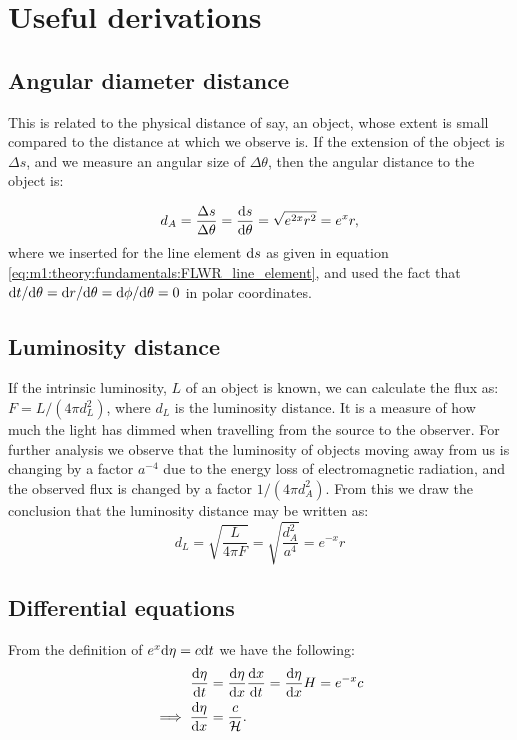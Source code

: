 \appendix

\section{Useful derivations}\label{app:derivations}
    \subsection{Angular diameter distance}
        This is related to the physical distance of say, an object, whose extent is small compared to the distance at which we observe is. If the extension of the object is $\Delta s$, and we measure an angular size of $\Delta\theta$, then the angular distance to the object is:

        \begin{equation}\label{eq:app:derivations:angular_distance}
            d_A = \frac{\Delta s}{\Delta\theta} = \frac{\mathrm{d} s}{\mathrm{d}\theta} = \sqrt{e^{2x}r^2} = e^xr,
        \end{equation}
        where we inserted for the line element $\mathrm{d} s$ as given in equation \cref{eq:m1:theory:fundamentals:FLWR_line_element}, and used the fact that $\mathrm{d} t/\mathrm{d} \theta = \mathrm{d} r/\mathrm{d}\theta = \mathrm{d}\phi/\mathrm{d}\theta  = 0$ in polar coordinates. 

    \subsection{Luminosity distance}
        If the intrinsic luminosity, $L$ of an object is known, we can calculate the flux as: $F=L/(4\pi d_L^2)$, where $d_L$ is the luminosity distance. It is a measure of how much the light has dimmed when travelling from the source to the observer. For further analysis we observe that the luminosity of objects moving away from us is changing by a factor $a^{-4}$ due to the energy loss of electromagnetic radiation, and the observed flux is changed by a factor $1/(4\pi d_A^2)$. From this we draw the conclusion that the luminosity distance may be written as:
        \begin{equation}
            d_L = \sqrt{\frac{L}{4\pi F}} = \sqrt{\frac{d_A^2}{a^4}} = e^{-x}r 
        \end{equation}

    \subsection{Differential equations}
    From the definition of $e^x\mathrm{d}\eta = c\mathrm{d} t$ we have the following:
    \begin{equation}
        \begin{split}
            \dv{\eta}{t} &= \dv{\eta}{x}\dv{x}{t}= \dv{\eta}{x}H = e^{-x}c \\
            \implies \dv{\eta}{x} &= \frac{c}{\mathcal{H}}.
        \end{split}
    \end{equation}

